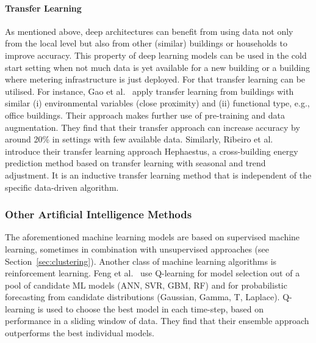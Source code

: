 \paragraph{Transfer Learning} As mentioned above, deep architectures can benefit from using data not only from the local level but also from other (similar) buildings or households to improve accuracy. This property of deep learning models can be used in the cold start setting when not much data is yet available for a new building or a building where metering infrastructure is just deployed. For that transfer learning can be utilised. For instance, Gao et al.~\cite{gao2020dla} apply transfer learning from buildings with similar (i) environmental variables (close proximity) and (ii) functional type, e.g., office buildings. 
Their approach makes further use of pre-training and data augmentation. They find that their transfer approach can increase accuracy by around 20\% in settings with few available data. 
Similarly, Ribeiro et al.~\cite{ribeiro2018tls} introduce their transfer learning approach Hephaestus, a cross-building energy prediction method based on transfer learning with seasonal and trend adjustment. It is an inductive transfer learning method that is independent of the specific data-driven algorithm. 

\subsubsection{Other Artificial Intelligence Methods}
The aforementioned machine learning models are based on supervised machine learning, sometimes in combination with unsupervised approaches (see Section~\ref{sec:clustering}). Another class of machine learning algorithms is reinforcement learning. Feng et al.~\cite{ Feng2020rda} use Q-learning for model selection out of a pool of candidate ML models (ANN, SVR, GBM, RF) and for probabilistic forecasting from candidate distributions (Gaussian, Gamma, T, Laplace). Q-learning is used to choose the best model in each time-step, based on performance in a sliding window of data. They find that their ensemble approach outperforms the best individual models. 

